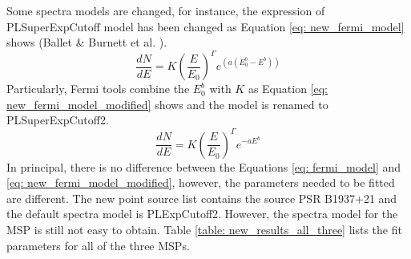 \documentclass[12pt]{report}
\newcommand{\mycaption}[1]{\protect \caption{#1}}
\begin{document}
    Some spectra models are changed, for instance, the expression of PLSuperExpCutoff model 
    has been changed as Equation \ref{eq: new_fermi_model} shows (Ballet \& Burnett et al. 
    \cite{newFermiModel}). 
    \begin{equation}
      \frac{dN}{dE} = K\left(\frac{E}{E_0}\right)^{\Gamma} e^{\left(a\left(E_0^b-E^b\right)\right)} 
      \label{eq: new_fermi_model}
    \end{equation}
    Particularly, Fermi tools combine the $E_0^b$ with $K$ as Equation 
    \ref{eq: new_fermi_model_modified} shows and the model is renamed to PLSuperExpCutoff2. 
    \begin{equation}
      \frac{dN}{dE} = K\left(\frac{E}{E_0}\right)^{\Gamma} e^{-aE^b} 
      \label{eq: new_fermi_model_modified}
    \end{equation}
    In principal, there is no difference between the Equations \ref{eq: fermi_model} and 
    \ref{eq: new_fermi_model_modified}, however, the parameters needed to be fitted are 
    different. The new point source list contains the source PSR B1937+21 and the default 
    spectra model is PLExpCutoff2. However, the spectra model for the MSP is still not easy 
    to obtain. Table \ref{table: new_results_all_three} lists the fit parameters for all of 
    the three MSPs.
\end{document}
